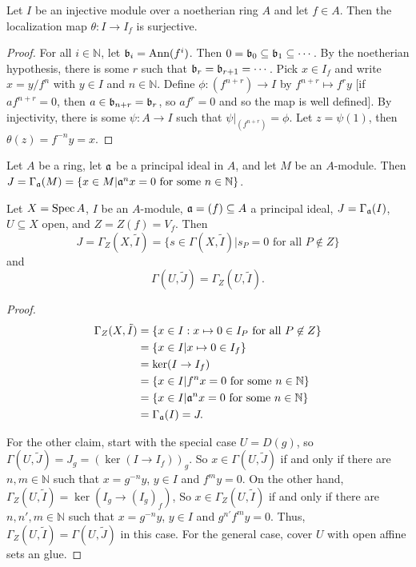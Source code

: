 \begin{lemma}\label{L:lec5lemma1}
Let $I$ be an injective module over a noetherian ring $A$ and let
$f\in A$.  Then the localization map $\theta:I\to I_f$ is
surjective.
\end{lemma}
\begin{proof}
For all $i\in \mathbb{N}$, let $\mathfrak{b}_i=\text{Ann}(f^i)$.  Then
$0=\mathfrak{b}_0\subseteq \mathfrak{b}_1\subseteq \cdots$.  By the noetherian
hypothesis, there is some $r$ such that $\mathfrak{b}_r=\mathfrak{b}_{r+1}=\cdots$.
Pick $x\in I_f$ and write $x=y/f^n$ with $y\in I$ and $n\in
\mathbb{N}$.  Define $\phi:(f^{n+r})\to I$ by $f^{n+r}\mapsto
f^ry$ [if $af^{n+r}=0$, then $a\in \mathfrak{b}_{n+r}=\mathfrak{b}_r$, so $af^r=0$ and
so the map is well defined]. By injectivity, there is some
$\psi:A\to I$ such that $\psi|_{(f^{n+r})}=\phi$. Let $z=\psi(1)$,
then $\theta(z)=f^{-n}y=x$.
\end{proof}

\begin{definition}[Exercise II.5.6] Let $A$ be a ring, let $\mathfrak{a}$ be a
principal ideal in $A$, and let $M$ be an $A$-module. Then
$J=\Gamma_{\mathfrak{a}}(M) = \{x\in M|\mathfrak{a}^nx=0 \text{ for some } n\in
\mathbb{N}\}$.
\end{definition}

\begin{lemma}
Let $X=\text{\rm Spec\,} A$, $I$ be an $A$-module, $\mathfrak{a}=(f)\subseteq A$ a
principal ideal, $J=\Gamma_{\mathfrak{a}}(I)$, $U\subseteq X$ open, and
$Z=Z(f)=V_f$.  Then
\[
    J=\Gamma_Z(X,\tilde I) = \{s\in \Gamma(X,\tilde I)|s_P=0 \text{ for all } P\not\in Z\}
\]
and
\[
 \Gamma(U,\tilde J) = \Gamma_Z(U,\tilde I).
\]
\end{lemma}
\begin{proof}
\begin{align*}
\Gamma_Z(X,\tilde I) &= \{x\in I: x\mapsto 0 \in I_P \text{ for
all } P\not\in Z\}\\
    &= \{x\in I| x\mapsto 0\in I_f\} \\
    &= \ker(I\to I_f) \\
    &=\{x\in I| f^nx=0 \text{ for some } n\in \mathbb{N}\}\\
    &=\{x\in I| \mathfrak{a}^nx=0 \text{ for some } n\in \mathbb{N}\}\\
    &= \Gamma_{\mathfrak{a}}(I) = J.
\end{align*}

For the other claim, start with the special case $U=D(g)$, so
$\Gamma(U,\tilde J)=J_g=(\ker(I\to I_f))_g$.  So $x\in
\Gamma(U,\tilde J)$ if and only if there are $n,m\in \mathbb{N}$
such that $x=g^{-n}y$, $y\in I$ and $f^my=0$. On the other hand,
$\Gamma_Z(U,\tilde I)=\ker(I_g\to (I_g)_f)$,  So $x\in
\Gamma_Z(U,\tilde I)$ if and only if there are $n,n',m\in
\mathbb{N}$ such that $x=g^{-n}y$, $y\in I$ and $g^{n'}f^my=0$.
Thus, $\Gamma_Z(U,\tilde I)=\Gamma(U,\tilde J)$ in this case. For
the general case, cover $U$ with open affine sets an glue.
\end{proof}

